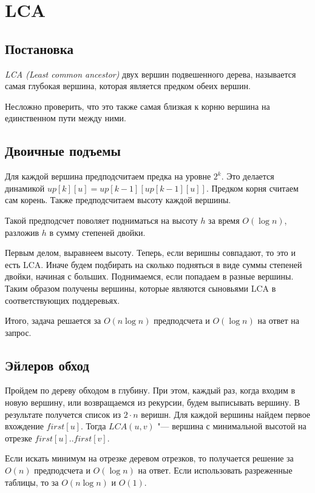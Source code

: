 \documentclass[12pt,a4paper]{article}
\theoremstyle{plain}
\begin{document}
\section{LCA}

\subsection{Постановка}

{\it LCA (Least common ancestor)} двух вершин подвешенного дерева,
называется самая глубокая вершина, которая является предком обеих вершин.

Несложно проверить, что это также самая близкая к корню вершина на единственном пути между ними.

\subsection{Двоичные подъемы}

Для каждой вершина предподсчитаем предка на уровне $2^k$.
Это делается динамикой $up[k][u] = up[k-1][up[k-1][u]]$.
Предком корня считаем сам корень. Также предподсчитаем высоту каждой вершины.

Такой предподсчет поволяет подниматься на высоту $h$ за время $O(\log{n})$,
разложив $h$ в сумму степеней двойки.

Первым делом, выравнеем высоту.
Теперь, если веришны совпадают, то это и есть LCA. 
Иначе будем подбирать на сколько подняться в виде суммы степеней двойки,
начиная с больших. Поднимаемся, если попадаем в разные вершины.
Таким образом получены вершины, которые являются сыновьями LCA в соответствующих поддеревьях.

Итого, задача решается за $O(n\log{n})$ предподсчета и $O(\log{n})$ на ответ на запрос.

\subsection{Эйлеров обход}

Пройдем по дереву обходом в глубину.
При этом, каждый раз, когда входим в новую вершину, или возвращаемся из рекурсии, 
будем выписывать вершину. В результате получется список из $2\cdot n$ веришн.
Для каждой вершины найдем первое вхождение $first[u]$.
Тогда $LCA(u, v)$ "--- вершина с минимальной высотой на отрезке $first[u]..first[v]$.

Если искать минимум на отрезке деревом отрезков, то получается решение за
$O(n)$ предподсчета и $O(\log{n})$ на ответ. Если использовать разреженные таблицы, то
за $O(n\log{n})$ и $O(1)$.
\end{document}
